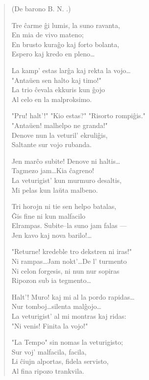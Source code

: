 \begin{verse}
\begin{center}
\footnotesize (De barono B. N. .)
\end{center}

                  Tre \^carme \^gi lumis, la suno ravanta,\\
                  En mia de vivo mateno;\\
                  En brusto kura\^go kaj forto bolanta,\\
                  Espero kaj kredo en pleno\dots

                  La kamp' estas lar\^ga kaj rekta la vojo\dots\\
                  "Anta\u uen sen halto kaj timo!"\\
                  La trio \^cevala ekkuris kun \^gojo\\
                  Al celo en la malproksimo.

                  "Pru! halt'!" "Kio estas?" "Risorto
                  rompi\^gis."\\
                  "Anta\u uen! malhelpo ne granda!"\\
                  Denove nun la veturil' ekruli\^gis,\\
                  Saltante sur vojo rubanda.

                  Jen mar\^co subite! Denove ni haltis\dots\\
                  Tagmezo jam\dots Kia \^cagreno!\\
                  La veturigist' kun murmuro desaltis,\\
                  Mi pelas kun la\u uta malbeno.

                  Tri horojn ni tie sen helpo batalas,\\
                  \^Gis fine ni kun malfacilo\\
                  Elrampas. Subite--la suno jam falas ---\\
                  Jen kavo kaj nova barilo!\dots

                  "Returne! kredeble tro dekstren ni iras!"\\
                  Ni rampas\dots Jam nokt'\dots De l' turmento\\
                  Ni celon forgesis, ni nun nur sopiras\\
                  Ripozon sub ia tegmento\dots

                  Halt'! Muro! kaj mi al la pordo rapidas\dots\\
                  Nur tomboj\dots silenta mal\^gojo\dots\\
                  La veturigist' al mi montras kaj ridas:\\
                  "Ni venis! Finita la vojo!"

                  "La Tempo" sin nomas la veturigisto;\\
                  Sur voj' malfacila, facila,\\
                  Li \^ciujn alportas, fidela servisto,\\
                  Al fina ripozo trankvila.

\end{verse}


\smallrule{}
